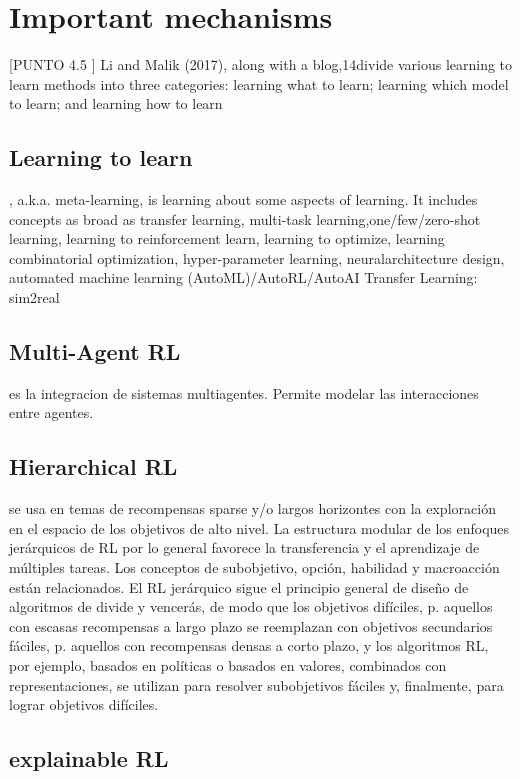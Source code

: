 \documentclass{svproc}
\begin{document}
\section{Important mechanisms}\label{ch:important_mechanisms}
[PUNTO 4.5 ]
Li and Malik (2017),  along with a blog,14divide various learning to learn methods into three categories:  learning what to learn; learning which model to learn;  and  learning  how  to  learn

\subsection{Learning to learn}, a.k.a.  meta-learning, is learning about some aspects of learning.   It  includes  concepts  as  broad  as  transfer  learning,  multi-task  learning,one/few/zero-shot  learning,  learning  to  reinforcement  learn,  learning  to  optimize,  learning  combinatorial  optimization,  hyper-parameter  learning,  neuralarchitecture design, automated machine learning (AutoML)/AutoRL/AutoAI
Transfer Learning: sim2real

\subsection{Multi-Agent RL} es la integracion de sistemas multiagentes. Permite modelar las interacciones entre agentes.

\subsection{Hierarchical RL} se usa en temas de recompensas sparse y/o largos horizontes con la exploración en el espacio de los objetivos de alto nivel. La estructura modular de los enfoques jerárquicos de RL por lo general favorece la transferencia y el aprendizaje de múltiples tareas. Los conceptos de subobjetivo, opción, habilidad y macroacción están relacionados. El RL jerárquico sigue el principio general de diseño de algoritmos de divide y vencerás, de modo que los objetivos difíciles, p. aquellos con escasas recompensas a largo plazo se reemplazan con objetivos secundarios fáciles, p. aquellos con recompensas densas a corto plazo, y los algoritmos RL, por ejemplo, basados en políticas o basados en valores, combinados con representaciones, se utilizan para resolver subobjetivos fáciles y, finalmente, para lograr objetivos difíciles.

\subsection{explainable RL}
\end{document}
